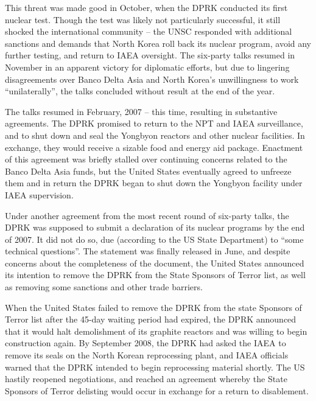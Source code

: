 \documentclass{article}
\begin{document}
This threat was made good in October, when the DPRK conducted its first nuclear test\cite{nti15}. Though the test was likely not particularly successful, it still shocked the international community – the UNSC responded with additional sanctions and demands that North Korea roll back its nuclear program, avoid any further testing, and return to IAEA oversight\cite{unsc1718}. The six-party talks resumed in November in an apparent victory for diplomatic efforts, but due to lingering disagreements over Banco Delta Asia and North Korea’s unwillingness to work “unilaterally”, the talks concluded without result at the end of the year\cite{davenport}.

The talks resumed in February, 2007 – this time, resulting in substantive agreements. The DPRK promised to return to the NPT and IAEA surveillance, and to shut down and seal the Yongbyon reactors and other nuclear facilities. In exchange, they would receive a sizable food and energy aid package\cite{6pt07}. Enactment of this agreement was briefly stalled over continuing concerns related to the Banco Delta Asia funds, but the United States eventually agreed to unfreeze them and in return the DPRK began to shut down the Yongbyon facility under IAEA supervision\cite{davenport}.

Under another agreement from the most recent round of six-party talks, the DPRK was supposed to submit a declaration of its nuclear programs by the end of 2007\cite{6pt07pt2}. It did not do so, due (according to the US State Department) to “some technical questions”\cite{seanm}. The statement was finally released in June, and despite concerns about the completeness of the document, the United States announced its intention to remove the DPRK from the State Sponsors of Terror list, as well as removing some sanctions and other trade barriers\cite{nti15}.

When the United States failed to remove the DPRK from the state Sponsors of Terror list after the 45-day waiting period had expired, the DPRK announced that it would halt demolishment of its graphite reactors and was willing to begin construction again\cite{davenport}. By September 2008, the DPRK had asked the IAEA to remove its seals on the North Korean reprocessing plant, and IAEA officials warned that the DPRK intended to begin reprocessing material shortly\cite{iaea09}. The US hastily reopened negotiations, and reached an agreement whereby the State Sponsors of Terror delisting would occur in exchange for a return to disablement\cite{nti15}.
\end{document}
